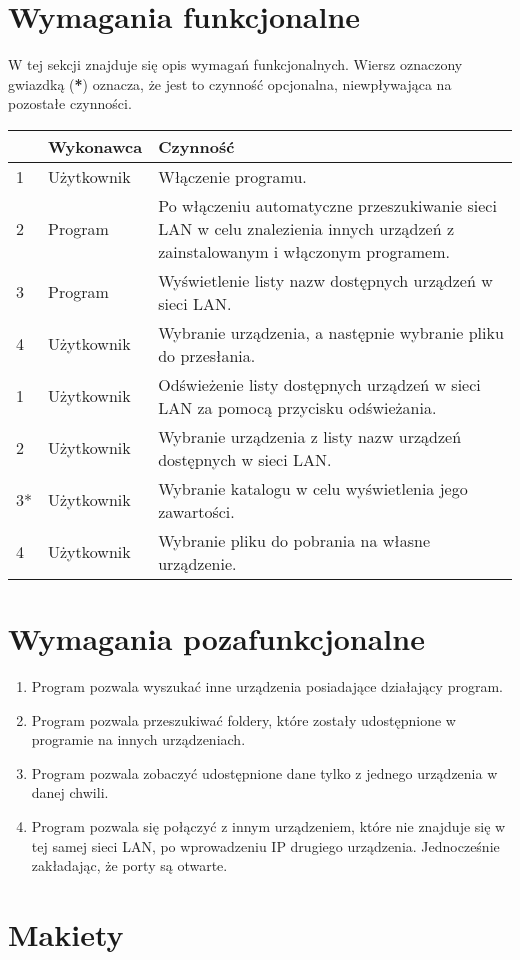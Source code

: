 \documentclass[12pt,a4paper]{article}
\begin{document}
\section{Wymagania funkcjonalne}
W tej sekcji znajduje się opis wymagań funkcjonalnych. Wiersz oznaczony gwiazdką (\textbf{*}) oznacza, że jest to czynność opcjonalna, niewpływająca na pozostałe czynności.

\begin{center}
	\begin{tabular}{|l|p{5em}|p{30em}|}
	\hline 
	 & Wykonawca & Czynność \\ 
	\hline
	1 & Użytkownik & Włączenie programu. \\
	\hline
	2 & Program & Po włączeniu automatyczne przeszukiwanie sieci LAN w celu znalezienia innych urządzeń z zainstalowanym i włączonym programem. \\
	\hline
	3 & Program & Wyświetlenie listy nazw dostępnych urządzeń w sieci LAN. \\
	\hline
	4 & Użytkownik & Wybranie urządzenia, a następnie wybranie pliku do przesłania. \\
	\hline
	\hline 
	1 & Użytkownik & Odświeżenie listy dostępnych urządzeń w sieci LAN za pomocą przycisku odświeżania. \\ 
	\hline 
	2 & Użytkownik & Wybranie urządzenia z listy nazw urządzeń dostępnych w sieci LAN. \\ 
	\hline 
	3* & Użytkownik & Wybranie katalogu w celu wyświetlenia jego zawartości. \\
	\hline
	4 & Użytkownik & Wybranie pliku do pobrania na własne urządzenie. \\
	\hline
	
	\end{tabular} 
\end{center}

\section{Wymagania pozafunkcjonalne}

\begin{enumerate}
	\item Program pozwala wyszukać inne urządzenia posiadające działający program.
	\item Program pozwala przeszukiwać foldery, które zostały udostępnione w programie na innych urządzeniach.
	\item Program pozwala zobaczyć udostępnione dane tylko z jednego urządzenia w danej chwili.
	\item Program pozwala się połączyć z innym urządzeniem, które nie znajduje się w tej samej sieci LAN, po wprowadzeniu IP drugiego urządzenia. Jednocześnie zakładając, że porty są otwarte.

\end{enumerate}

\section{Makiety}
\end{document}
